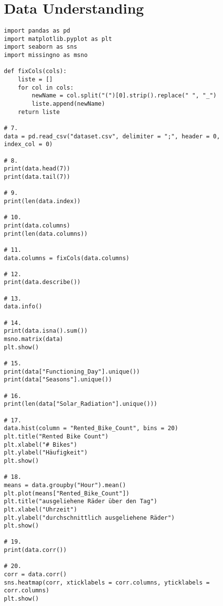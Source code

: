 \documentclass{article}
\begin{document}
	\section*{Data Understanding}
	\begin{lstlisting}
import pandas as pd
import matplotlib.pyplot as plt
import seaborn as sns
import missingno as msno

def fixCols(cols):
	liste = []
	for col in cols:
		newName = col.split("(")[0].strip().replace(" ", "_")
		liste.append(newName)
	return liste

# 7.
data = pd.read_csv("dataset.csv", delimiter = ";", header = 0, index_col = 0)

# 8.
print(data.head(7))
print(data.tail(7))

# 9. 
print(len(data.index))

# 10. 
print(data.columns)
print(len(data.columns))

# 11.
data.columns = fixCols(data.columns)

# 12.
print(data.describe())

# 13.
data.info()

# 14.
print(data.isna().sum())
msno.matrix(data)
plt.show()

# 15.
print(data["Functioning_Day"].unique())
print(data["Seasons"].unique())

# 16.
print(len(data["Solar_Radiation"].unique()))

# 17.
data.hist(column = "Rented_Bike_Count", bins = 20)
plt.title("Rented Bike Count")
plt.xlabel("# Bikes")
plt.ylabel("Häufigkeit")
plt.show()

# 18.
means = data.groupby("Hour").mean()
plt.plot(means["Rented_Bike_Count"])
plt.title("ausgeliehene Räder über den Tag")
plt.xlabel("Uhrzeit")
plt.ylabel("durchschnittlich ausgeliehene Räder")
plt.show()

# 19.
print(data.corr())

# 20.
corr = data.corr()
sns.heatmap(corr, xticklabels = corr.columns, yticklabels = corr.columns)
plt.show()
	\end{lstlisting}
	
\end{document}
